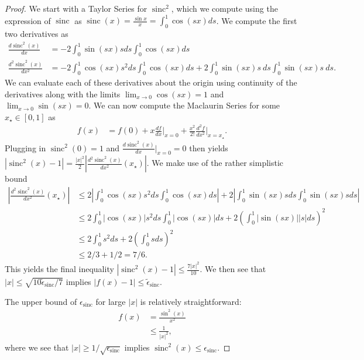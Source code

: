 \documentclass{article}
\newcommand{\parens}[1]{\left( #1 \right)}
\newcommand{\abs}[1]{\left| #1 \right|}
\DeclareMathOperator{\sinc}{sinc}
\begin{document}
\begin{proof}
    We start with a Taylor Series for $\sinc^2$, which we compute using the expression of $\sinc$ as $\sinc(x) = \frac{\sin x}{x} = \int_0^1 \cos(sx) ds$. We compute the first two derivatives as
    \begin{align}
        \frac{d \sinc^2(x)}{dx} &= -2 \int_0^1 \sin(sx) s ds \int_0^1 \cos(sx) ds \\
        \frac{d^2 \sinc^2(x)}{dx^2} &= -2 \int_0^1 \cos(sx)s^2 ds \int_0^1 \cos(sx) ds + 2\int_0^1 \sin(sx) s ~ds \int_0^1 \sin(sx) s ~ds.
    \end{align}
    We can evaluate each of these derivatives about the origin using continuity of the derivatives along with the limits $\lim_{x \to 0} \cos(sx) = 1$ and $\lim_{x \to 0} \sin(sx) = 0$. We can now compute the Maclaurin Series for some $x_{\star} \in [0,1]$ as
    \begin{align}
        f(x) &= f(0) + x \frac{df}{dx}\bigg|_{x = 0} + \frac{x^2}{2!} \frac{d^2f}{dx^2}\bigg|_{x = x_{\star}}.
    \end{align}
    Plugging in $\sinc^2(0) = 1$ and $\frac{d\sinc^2(x)}{dx}\big|_{x = 0} = 0$ then yields $|\sinc^2(x) - 1| = \frac{|x|^2}{2} \abs{\frac{d^2\sinc^2(x)}{dx^2}(x_{\star})}$. We make use of the rather simplistic bound
    \begin{align}
        \abs{\frac{d^2\sinc^2(x)}{dx^2}(x_{\star})} &\leq 2 \abs{\int_0^1 \cos(sx) s^2 ds \int_0^1 \cos(sx) ds} + 2\abs{\int_0^1 \sin(sx) s ds \int_0^1 \sin(sx) s ds} \\
        &\leq 2 \int_0^1 \abs{\cos(sx)} s^2 ds \int_0^1 \abs{\cos(sx)} ds + 2\parens{\int_0^1 \abs{\sin(sx)} |s| ds}^2 \\
        &\leq 2 \int_0^1 s^2 ds + 2\parens{\int_0^1 s ds}^2 \\
        &\leq 2/3 + 1/2 = 7/6.
    \end{align}
    This yields the final inequality $|\sinc^2(x) - 1| \leq \frac{7|x|^2}{10}$. We then see that $|x| \leq \sqrt{10 \widetilde{\epsilon}_{\sinc}/7}$ implies $|f(x) - 1| \leq \widetilde{\epsilon}_{\sinc}$. 

    The upper bound of $\epsilon_{\sinc}$ for large $|x|$ is relatively straightforward:
    \begin{align}
        f(x) &= \frac{\sin^2(x)}{x^2} \\
            &\leq \frac{1}{|x|^2},
    \end{align}
    where we see that $|x| \geq 1 / \sqrt{\epsilon_{\sinc}}$ implies $\sinc^2(x) \leq \epsilon_{\sinc}$.
\end{proof}
\end{document}
